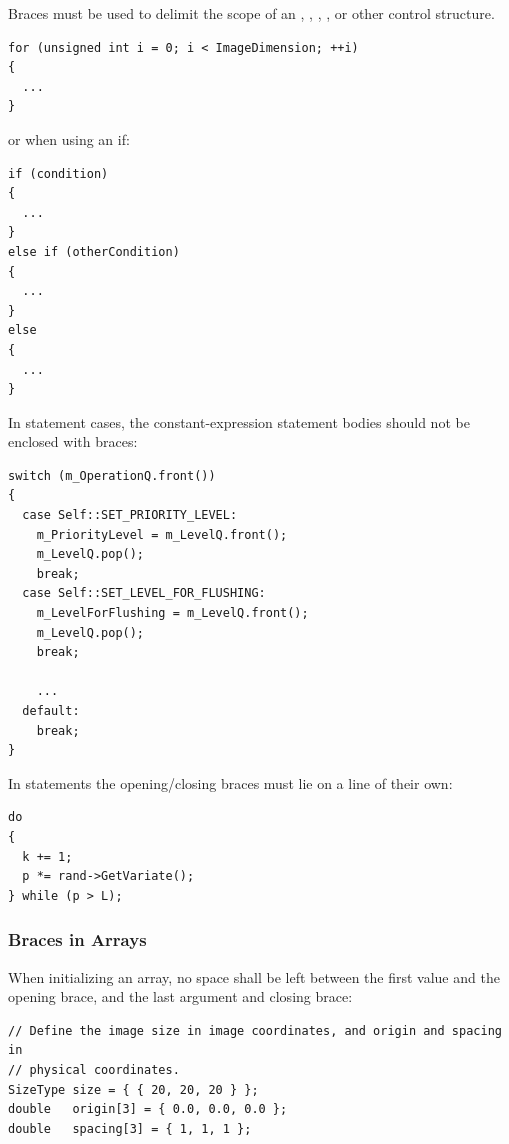 Braces must be used to delimit the scope of an , ,
, , or other control structure.

\small
\begin{verbatim}
for (unsigned int i = 0; i < ImageDimension; ++i)
{
  ...
}
\end{verbatim}
\normalsize

or when using an if:

\small

\begin{verbatim}
if (condition)
{
  ...
}
else if (otherCondition)
{
  ...
}
else
{
  ...
}
\end{verbatim}
\normalsize

In  statement cases, the constant-expression statement bodies should
not be enclosed with braces:

\small
\begin{verbatim}
switch (m_OperationQ.front())
{
  case Self::SET_PRIORITY_LEVEL:
    m_PriorityLevel = m_LevelQ.front();
    m_LevelQ.pop();
    break;
  case Self::SET_LEVEL_FOR_FLUSHING:
    m_LevelForFlushing = m_LevelQ.front();
    m_LevelQ.pop();
    break;

    ...
  default:
    break;
}
\end{verbatim}
\normalsize

In  statements the opening/closing braces must lie on a line of
their own:

\small
\begin{verbatim}
do
{
  k += 1;
  p *= rand->GetVariate();
} while (p > L);
\end{verbatim}
\normalsize

\subsubsection{Braces in Arrays}%
\label{subsubsec:BracesInArrays}

When initializing an array, no space shall be left between the first value and
the opening brace, and the last argument and closing brace:

\small
\begin{verbatim}
// Define the image size in image coordinates, and origin and spacing in
// physical coordinates.
SizeType size = { { 20, 20, 20 } };
double   origin[3] = { 0.0, 0.0, 0.0 };
double   spacing[3] = { 1, 1, 1 };
\end{verbatim}
\normalsize


